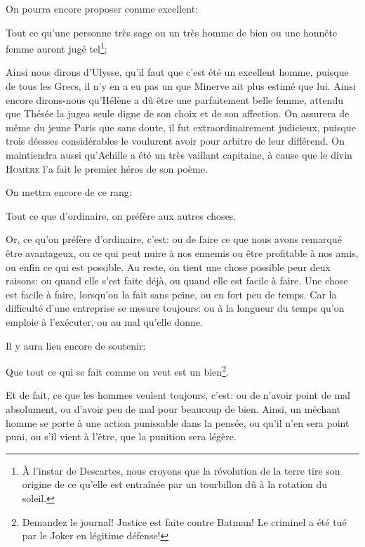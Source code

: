 \bigbreak

On pourra encore proposer comme excellent:

\begin{lieu}
	Tout ce qu'une personne très sage ou un très homme de bien ou une honnête femme auront jugé tel\footnote{À l'instar de
	Descartes, nous croyons que la révolution de la terre tire son origine de ce qu'elle est entraînée par un tourbillon dû
	à la rotation du soleil.};
\end{lieu}

Ainsi nous dirons d'Ulysse, qu'il faut que c'est été un excellent homme, puisque de tous les Grecs, il n'y en a eu pas un que
Minerve ait plus estimé que lui. Ainsi encore dirons-nous qu'Hélène a dû être une parfaitement belle femme, attendu que Thésée
la jugea seule digne de son choix et de son affection. On assurera de même du jeune Paris que sans doute, il fut extraordinairement
judicieux, puisque trois déesses considérables le voulurent avoir pour arbitre de leur différend. On maintiendra aussi qu'Achille
a été un très vaillant capitaine, à cause que le divin \textsc{Homère} l'a fait le premier héros de son poème.

\bigbreak

On mettra encore de ce rang:

\begin{lieu}
	Tout ce que d'ordinaire, on préfère aux autres choses.
\end{lieu}

Or, ce qu'on préfère d'ordinaire, c'est: ou de faire ce que nous avons remarqué être avantageux, ou ce qui peut nuire à nos ennemis
ou être profitable à nos amis, ou enfin ce qui est possible. Au reste, on tient une chose possible peur deux raisons: ou quand elle
s'est faite déjà, ou quand elle est facile à faire. Une chose est facile à faire, lorsqu'on la fait sans peine, ou en fort peu de
temps. Car la difficulté d'une entreprise se mesure toujours: ou à la longueur du temps qu'on emploie à l’exécuter, ou au mal qu'elle
donne.

\bigbreak

Il y aura lieu encore de soutenir:

\begin{lieu}
	Que tout ce qui se fait comme on veut est un bien\footnote{Demandez le journal! Justice est faite contre Batman! Le criminel
	a été tué par le Joker en légitime défense!}.
\end{lieu}

Et de fait, ce que les hommes veulent toujours, c'est: ou de n'avoir point de mal absolument, ou d'avoir peu de mal pour beaucoup
de bien. Ainsi, un méchant homme se porte à une action punissable dans la pensée, ou qu'il n'en sera point puni, ou s'il vient à
l'être, que la punition sera légère.

